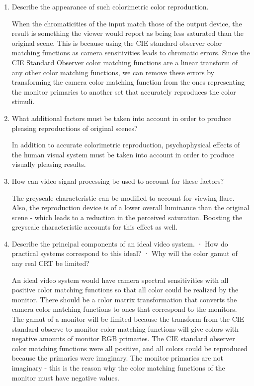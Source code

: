 \begin{enumerate}
 \item
 Describe the appearance of such colorimetric color reproduction. \newline
 \par When the chromaticities of the input match those of the output device, the result is something the viewer would report as being less saturated than the original scene. This is because using the CIE standard observer color matching functions as camera sensitivities leads to chromatic errors. Since the CIE Standard Observer color matching functions are a linear transform of any other color matching functions, we can remove these errors by transforming the camera color matching function from the ones representing the monitor primaries to another set that accurately reproduces the color stimuli. \newline
 \item
  What additional factors must be taken into account in order to produce pleasing reproductions of original scenes? \newline
 \par In addition to accurate colorimetric reproduction, psychophysical effects of the human visual system must be taken into account in order to produce visually pleasing results. \newline
 \item
  How can video signal processing be used to account for these factors? \newline
 \par The greyscale characteristic can be modified to account for viewing flare.  Also, the reproduction device is of a lower overall luminance than the original scene - which leads to a reduction in the perceived saturation.  Boosting the greyscale characteristic accounts for this effect as well. \newline
 \item
 Describe the principal components of an ideal video system. · How do practical systems correspond to this ideal? · Why will the color gamut of any real CRT be limited? \newline
 \par An ideal video system would have camera spectral sensitivities with all positive color matching functions so that all color could be realized by the monitor.  There should be a color matrix transformation that converts the camera color matching functions to ones that correspond to the monitors.  The gamut of a monitor will be limited because the transform from the CIE standard observe to monitor color matching functions will give colors with negative amounts of monitor RGB primaries.  The CIE standard observer color matching functions were all positive, and all colors could be reproduced because the primaries were imaginary.  The monitor primaries are not imaginary - this is the reason why the color matching functions of the monitor must have negative values. \newline

\end{enumerate}
